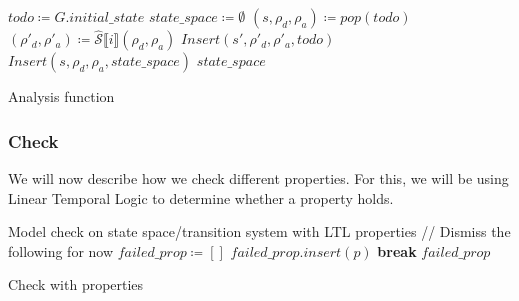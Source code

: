 \begin{algorithm}[htb!]
    \begin{codebox}
        \li $todo \coloneqq G.initial\_state$
        \li $state\_space \coloneqq \emptyset$
        \li {}
        \li \Do
        $(s,\rho_d,\rho_a) \coloneqq pop(todo)$
        \li {}
        \li \Do $(\rho'_d,\rho'_a) \coloneqq \widehat{\mathcal{S}}\llbracket i\rrbracket(\rho_d,\rho_a)$
        \li {}
        \li \Do $Insert(s',\rho'_d,\rho'_a,todo)$
        \End
        \End
        \li $Insert(s,\rho_d,\rho_a,state\_space)$
        \End
        \End
        \End
        \End
        \li \Return $state\_space$
    \end{codebox}
    \caption{Analysis function}
    \label{alg:analysis}

\end{algorithm}

\subsubsection{Check}\label{subsubsec:check}

We will now describe how we check different properties.
For this, we will be using Linear Temporal Logic to determine whether a property holds.

\begin{algorithm}[htb!]
    \begin{codebox}
        \li Model check on state space/transition system
        \zi with LTL properties
        \li // Dismiss the following for now
        \li $failed\_prop \coloneqq []$
        \li {}
        \li \Do {}
        \li \Do {}
        \li \Do $failed\_prop.insert(p)$
        \End
        \End
        \li \textbf{break}
        \End
        \End
        \End
        \End
        \li \Return $failed\_prop$
    \end{codebox}
    \caption{Check with properties}
    \label{alg:check}
\end{algorithm}
